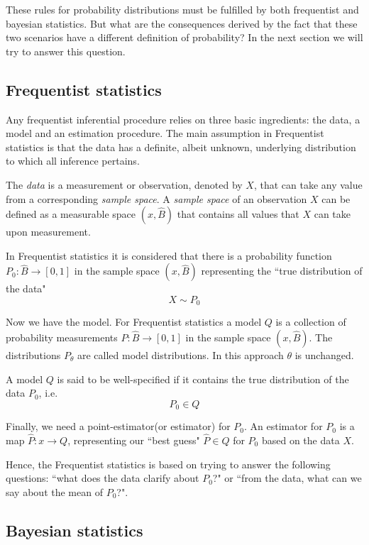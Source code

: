 \documentclass[onecolumn,           %
               showpacs,            %
               preprintnumbers,     %
               aps,                 %
               prl,          	    %
               letterpaper,             %
               superscriptaddress,      %
               nofootinbib,         %
               tightenlines,        %
               floats,floatfix      %
               ,usenatbib,
               ]{revtex4-1}
\begin{document}
These rules for probability distributions must be fulfilled by both frequentist and bayesian statistics. But what are the consequences derived by the fact that these two scenarios have a different definition of probability? In the next section we will try to answer this question.

\subsection{Frequentist statistics}

Any frequentist inferential procedure relies on three basic ingredients: the data, a model and an estimation procedure. The main assumption in Frequentist statistics is that the data has a definite, albeit unknown, underlying distribution to which all inference pertains.

The \textit{data} is a measurement or observation, denoted by $X$, that can take any value from a corresponding \textit{sample space}. A \textit{sample space} of an observation $X$ can be defined as a measurable space $(x,\hat B)$ that contains all values that $X$ can take upon measurement.

In Frequentist statistics it is considered that there is a probability function $P_0:\hat B\rightarrow [0,1]$ in the sample space $(x,\hat B)$ representing the ``true distribution of the data"
\[X\sim P_0\]

Now we have the model. For Frequentist statistics a model $Q$ is a collection of probability measurements $P:\hat B\rightarrow[0,1]$ in the sample space $(x,\hat B)$. The distributions $P_\theta$ are called model distributions. In this approach $\theta$ is unchanged. 

A model $Q$ is said to be well-specified if it contains the true distribution of the data $P_0$, i.e.
\[P_0\in Q\]

Finally, we need a point-estimator(or estimator) for $P_0$. An estimator for $P_0$ is a map $\hat P:x\rightarrow Q$, representing our ``best guess" $\hat P\in Q$ for $P_0$ based on the data $X$.

Hence, the Frequentist statistics is based on trying to answer the following questions: ``what does the data clarify about $P_0$?" or ``from the data, what can we say about the mean of $P_0$?".

\subsection{Bayesian statistics}
\end{document}
